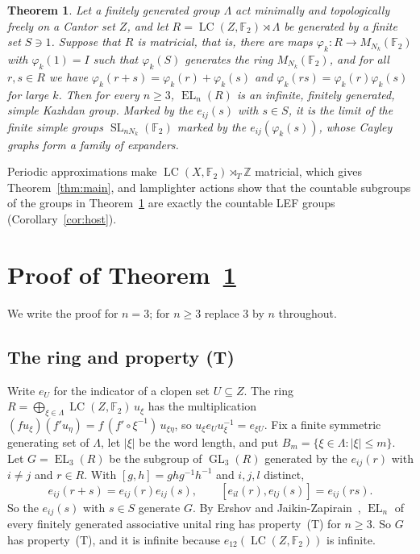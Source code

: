 \documentclass[11pt]{amsart}
\newtheorem{theorem}{Theorem}
\newcommand{\F}{\mathbb F}
\newcommand{\Z}{\mathbb Z}
\newcommand{\LC}{\operatorname{LC}}
\newcommand{\EL}{\operatorname{EL}}
\newcommand{\GL}{\operatorname{GL}}
\newcommand{\SL}{\operatorname{SL}}
\begin{document}
\begin{theorem}\label{thm:general}
Let a finitely generated group $\Lambda$ act minimally and topologically
freely on a Cantor set $Z$, and let $R=\LC(Z,\F_2)\rtimes\Lambda$ be
generated by a finite set $S\ni1$. Suppose that $R$ is matricial, that
is, there are maps $\varphi_k\colon R\to M_{N_k}(\F_2)$ with
$\varphi_k(1)=I$ such that $\varphi_k(S)$ generates the ring
$M_{N_k}(\F_2)$, and for all $r,s\in R$ we have
$\varphi_k(r+s)=\varphi_k(r)+\varphi_k(s)$ and
$\varphi_k(rs)=\varphi_k(r)\varphi_k(s)$ for large $k$. Then for every
$n\ge3$, $\EL_n(R)$ is an infinite, finitely generated, simple Kazhdan
group. Marked by the $e_{ij}(s)$ with $s\in S$, it is the limit of the
finite simple groups $\SL_{nN_k}(\F_2)$ marked by the
$e_{ij}(\varphi_k(s))$, whose Cayley graphs form a family of expanders.
\end{theorem}

Periodic approximations make $\LC(X,\F_2)\rtimes_T\Z$ matricial, which
gives Theorem~\ref{thm:main}, and lamplighter actions show that the
countable subgroups of the groups in Theorem~\ref{thm:general} are exactly
the countable LEF groups (Corollary~\ref{cor:host}).

\section{Proof of Theorem~\ref{thm:general}}\label{sec:proof}

We write the proof for $n=3$; for $n\ge3$ replace $3$ by $n$ throughout.

\subsection*{The ring and property (T)}
Write $e_U$ for the indicator of a clopen set $U\subseteq Z$. The ring
$R=\bigoplus_{\xi\in\Lambda}\LC(Z,\F_2)\,u_\xi$ has the multiplication
$(fu_\xi)(f'u_\eta)=f\,(f'\circ\xi^{-1})\,u_{\xi\eta}$, so
$u_\xi e_Uu_\xi^{-1}=e_{\xi U}$. Fix a finite symmetric generating set of
$\Lambda$, let $|\xi|$ be the word length, and put
$B_m=\{\xi\in\Lambda:|\xi|\le m\}$. Let $G=\EL_3(R)$ be the subgroup of
$\GL_3(R)$ generated by the $e_{ij}(r)$ with $i\ne j$ and $r\in R$. With
$[g,h]=ghg^{-1}h^{-1}$ and $i,j,l$ distinct,
\begin{equation}\label{eq:elementary}
 e_{ij}(r+s)=e_{ij}(r)e_{ij}(s),\qquad [e_{il}(r),e_{lj}(s)]=e_{ij}(rs).
\end{equation}
So the $e_{ij}(s)$ with $s\in S$ generate $G$. By Ershov and
Jaikin-Zapirain~\cite[Theorem~1.1]{EJZ}, $\EL_n$ of every finitely
generated associative unital ring has property~\textup{(T)} for $n\ge3$.
So $G$ has property~\textup{(T)}, and it is infinite because
$e_{12}(\LC(Z,\F_2))$ is infinite.
\end{document}
